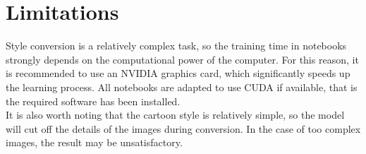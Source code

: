 \documentclass{article}
\begin{document}
\section{Limitations}
Style conversion is a relatively complex task, so the training time in notebooks strongly depends on the computational power of the computer. For this reason, it is recommended to use an NVIDIA graphics card, which significantly speeds up the learning process. All notebooks are adapted to use CUDA if available, that is the required software has been installed.
\vspace{3mm} \\
It is also worth noting that the cartoon style is relatively simple, so the model will cut off the details of the images during conversion. In the case of too complex images, the result may be unsatisfactory.
\end{document}
